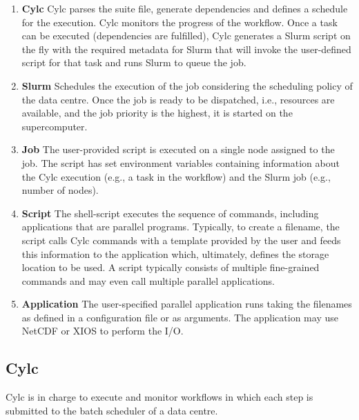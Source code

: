 \documentclass[a4paper]{article}
\begin{document}
\begin{enumerate}
  \item \textbf{Cylc} Cylc parses the suite file, generate dependencies and defines a schedule for the execution.
  Cylc monitors the progress of the workflow.
  Once a task can be executed (dependencies are fulfilled), Cylc generates a Slurm script on the fly with the required metadata for Slurm that will invoke the user-defined script for that task and runs Slurm to queue the job.

  \item \textbf{Slurm} Schedules the execution of the job considering the scheduling policy of the data centre.
  Once the job is ready to be dispatched, i.e., resources are available, and the job priority is the highest, it is started on the supercomputer.

  \item \textbf{Job} The user-provided script is executed on a single node assigned to the job.
  The script has set environment variables containing information about the Cylc execution (e.g., a task in the workflow) and the Slurm job (e.g., number of nodes).

  \item \textbf{Script} The shell-script executes the sequence of commands, including applications that are parallel programs.
  Typically, to create a filename, the script calls Cylc commands with a template provided by the user and feeds this information to the application which, ultimately, defines the storage location to be used.
  A script typically consists of multiple fine-grained commands and may even call multiple parallel applications.

  \item \textbf{Application} The user-specified parallel application runs taking the filenames as defined in a configuration file or as arguments.
  The application may use NetCDF or XIOS to perform the I/O.
\end{enumerate}


\subsection{Cylc}

Cylc is in charge to execute and monitor workflows in which each step is submitted to the batch scheduler of a data centre.
\end{document}
